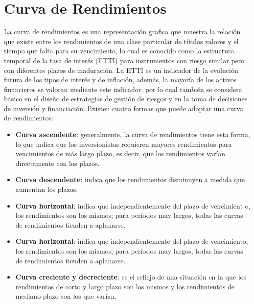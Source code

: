 \documentclass[
  12pt,
]{krantz}
\begin{document}
\mainmatter

\hypertarget{curva-de-rendimientos}{%
\chapter{Curva de Rendimientos}\label{curva-de-rendimientos}}

La curva de rendimientos es una representación grafica que muestra la relación que existe entre los rendimientos de una clase particular de títulos valores y el tiempo que falta para su vencimiento, lo cual es conocido como la estructura temporal de la tasa de interés (ETTI) para instrumentos con riesgo similar pero con diferentes plazos de maduración. La ETTI es un indicador de la evolución futura de los tipos de interés y de inflación, además, la mayoría de los activos financieros se valoran mediante este indicador, por lo cual también se considera básico en el diseño de estrategias de gestión de riesgos y en la toma de decisiones de inversión y financiación. Existen cuatro formas que puede adoptar una curva de rendimientos:

\begin{itemize}
\item
  \textbf{Curva ascendente}: generalmente, la curva de rendimientos tiene esta forma, lo que indica que los inversionistas requieren mayores rendimientos para vencimientos de más largo plazo, es decir, que los rendimientos varían directamente con los plazos.
\item
  \textbf{Curva descendente}: indica que los rendimientos disminuyen a medida que aumentan los plazos.
\item
  \textbf{Curva horizontal}: indica que independientemente del plazo de vencimient o, los rendimientos son los mismos; para períodos muy largos, todas las curvas de rendimientos tienden a aplanarse.
\item
  \textbf{Curva horizontal}: indica que independientemente del plazo de vencimiento, los rendimientos son los mismos; para períodos muy largos, todas las curvas de rendimientos tienden a aplanarse.
\item
  \textbf{Curva creciente y decreciente}: es el reflejo de una situación en la que los rendimientos de corto y largo plazo son los mismos y los rendimientos de mediano plazo son los que varían.
\end{itemize}
\end{document}
